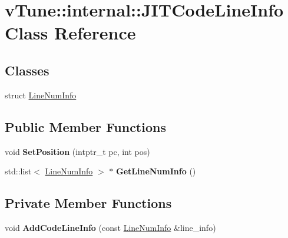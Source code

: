 \hypertarget{classv_tune_1_1internal_1_1_j_i_t_code_line_info}{}\section{v\+Tune\+:\+:internal\+:\+:J\+I\+T\+Code\+Line\+Info Class Reference}
\label{classv_tune_1_1internal_1_1_j_i_t_code_line_info}
\subsection*{Classes}
\begin{DoxyCompactItemize}
\item 
struct \hyperlink{structv_tune_1_1internal_1_1_j_i_t_code_line_info_1_1_line_num_info}{Line\+Num\+Info}
\end{DoxyCompactItemize}
\subsection*{Public Member Functions}
\begin{DoxyCompactItemize}
\item 
void {\bfseries Set\+Position} (intptr\+\_\+t pc, int pos)\hypertarget{classv_tune_1_1internal_1_1_j_i_t_code_line_info_a2de941005e294c882d2b6a611f6c888a}{}\label{classv_tune_1_1internal_1_1_j_i_t_code_line_info_a2de941005e294c882d2b6a611f6c888a}

\item 
std\+::list$<$ \hyperlink{structv_tune_1_1internal_1_1_j_i_t_code_line_info_1_1_line_num_info}{Line\+Num\+Info} $>$ $\ast$ {\bfseries Get\+Line\+Num\+Info} ()\hypertarget{classv_tune_1_1internal_1_1_j_i_t_code_line_info_ac93412d598d5738a5154af6140e0b638}{}\label{classv_tune_1_1internal_1_1_j_i_t_code_line_info_ac93412d598d5738a5154af6140e0b638}

\end{DoxyCompactItemize}
\subsection*{Private Member Functions}
\begin{DoxyCompactItemize}
\item 
void {\bfseries Add\+Code\+Line\+Info} (const \hyperlink{structv_tune_1_1internal_1_1_j_i_t_code_line_info_1_1_line_num_info}{Line\+Num\+Info} \&line\+\_\+info)\hypertarget{classv_tune_1_1internal_1_1_j_i_t_code_line_info_a739d56e4b08ff7d5d314a11201c78cd0}{}\label{classv_tune_1_1internal_1_1_j_i_t_code_line_info_a739d56e4b08ff7d5d314a11201c78cd0}

\end{DoxyCompactItemize}
